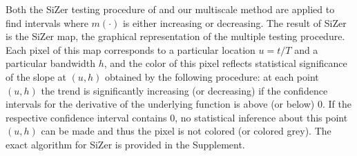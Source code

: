 \documentclass[a4paper,12pt]{article}
\begin{document}
\tabcolsep=0.11cm
%
%
%
 
Both the SiZer testing procedure of \cite{Rondonotti2007} and our multiscale method are applied to find intervals where $m(\cdot)$ is either increasing or decreasing. The result of SiZer is the SiZer map, the graphical representation of the multiple testing procedure. Each pixel of this map corresponds to a particular location $u = t/T$ and a particular bandwidth $h$, and the color of this pixel reflects statistical significance of the slope at $(u, h)$ obtained by the following procedure: at each point $(u, h)$ the trend is significantly increasing (or decreasing) if the confidence intervals for the derivative of the underlying function is above (or below) $0$. If the respective confidence interval contains $0$, no statistical inference about this point $(u, h)$ can be made and thus the pixel is not colored (or colored grey). The exact algorithm for SiZer is provided in the Supplement. 
\end{document}

